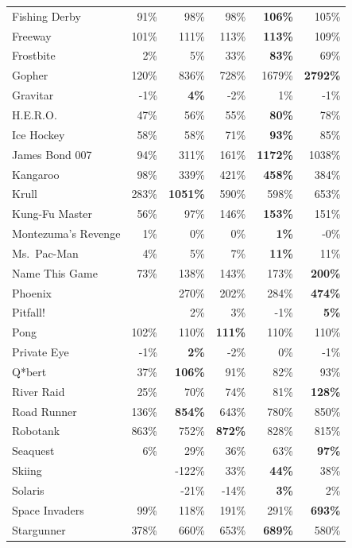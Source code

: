 \documentclass[a4paper]{article}
\begin{document}
\begin{table}[p]
{{\begin{tabular}{|l|rr|rrr|}
Fishing Derby & 91\% & 98\% & 98\% & \textbf{106\%} & 105\%\\
Freeway & 101\% & 111\% & 113\% & \textbf{113\%} & 109\%\\
Frostbite & 2\% & 5\% & 33\% & \textbf{83\%} & 69\%\\
Gopher & 120\% & 836\% & 728\% & 1679\% & \textbf{2792\%}\\
Gravitar & -1\% & \textbf{4\%} & -2\% & 1\% & -1\%\\
H.E.R.O. & 47\% & 56\% & 55\% & \textbf{80\%} & 78\%\\
Ice Hockey & 58\% & 58\% & 71\% & \textbf{93\%} & 85\%\\
James Bond 007 & 94\% & 311\% & 161\% & \textbf{1172\%} & 1038\%\\
Kangaroo & 98\% & 339\% & 421\% & \textbf{458\%} & 384\%\\
Krull & 283\% & \textbf{1051\%} & 590\% & 598\% & 653\%\\
Kung-Fu Master & 56\% & 97\% & 146\% & \textbf{153\%} & 151\%\\
Montezuma's Revenge & 1\% & 0\% & 0\% & \textbf{1\%} & -0\%\\
Ms.\ Pac-Man & 4\% & 5\% & 7\% & \textbf{11\%} & 11\%\\
Name This Game & 73\% & 138\% & 143\% & 173\% & \textbf{200\%}\\
Phoenix &  & 270\% & 202\% & 284\% & \textbf{474\%}\\
Pitfall! &  & 2\% & 3\% & -1\% & \textbf{5\%}\\
Pong & 102\% & 110\% & \textbf{111\%} & 110\% & 110\%\\
Private Eye & -1\% & \textbf{2\%} & -2\% & 0\% & -1\%\\
Q*bert & 37\% & \textbf{106\%} & 91\% & 82\% & 93\%\\
River Raid & 25\% & 70\% & 74\% & 81\% & \textbf{128\%}\\
Road Runner & 136\% & \textbf{854\%} & 643\% & 780\% & 850\%\\
Robotank & 863\% & 752\% & \textbf{872\%} & 828\% & 815\%\\
Seaquest & 6\% & 29\% & 36\% & 63\% & \textbf{97\%}\\
Skiing &  & -122\% & 33\% & \textbf{44\%} & 38\%\\
Solaris &  & -21\% & -14\% & \textbf{3\%} & 2\%\\
Space Invaders & 99\% & 118\% & 191\% & 291\% & \textbf{693\%}\\
Stargunner & 378\% & 660\% & 653\% & \textbf{689\%} & 580\%\\

\end{tabular}}}
\end{table}
\end{document}
